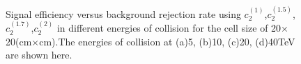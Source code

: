 \documentclass[final,1p,11pt]{elsarticle}
\begin{document}
\begin{figure}
\begin{center}

\end{center}
\caption{Signal efficiency versus background rejection rate using $c_2^{(1)}$,$c_2^{(1.5)}$,$c_2^{(1.7)}$,$c_2^{(2)}$ in different energies of collision for the cell size of  20$\times$20(cm$\times$cm).The energies of collision at (a)5, (b)10, (c)20, (d)40TeV are shown here.}
\label{fig:cluster_r010_c_variable}
\end{figure}
\end{document}
